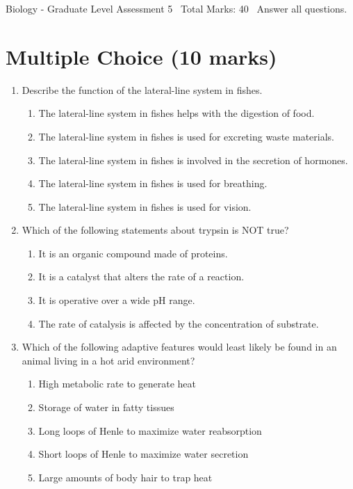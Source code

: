 \documentclass[12pt]{article}
\begin{document}
\begin{center}
Biology - Graduate Level Assessment 5 \
Total Marks: 40 \
Answer all questions.
\end{center}

\section*{Multiple Choice (10 marks)}
\begin{enumerate}[label=\arabic*.]
\item Describe the function of the lateral-line system in fishes.
\begin{enumerate}[label=(\alph*)]
    \item The lateral-line system in fishes helps with the digestion of food.
    \item The lateral-line system in fishes is used for excreting waste materials.
    \item The lateral-line system in fishes is involved in the secretion of hormones.
    \item The lateral-line system in fishes is used for breathing.
    \item The lateral-line system in fishes is used for vision.
\end{enumerate}
\item Which of the following statements about trypsin is NOT true?
\begin{enumerate}[label=(\alph*)]
    \item It is an organic compound made of proteins.
    \item It is a catalyst that alters the rate of a reaction.
    \item It is operative over a wide pH range.
    \item The rate of catalysis is affected by the concentration of substrate.
\end{enumerate}
\item Which of the following adaptive features would least likely be found in an animal living
in a hot arid environment?
\begin{enumerate}[label=(\alph*)]
    \item High metabolic rate to generate heat
    \item Storage of water in fatty tissues
    \item Long loops of Henle to maximize water reabsorption
    \item Short loops of Henle to maximize water secretion
    \item Large amounts of body hair to trap heat

\end{enumerate}
\end{enumerate}
\end{document}
